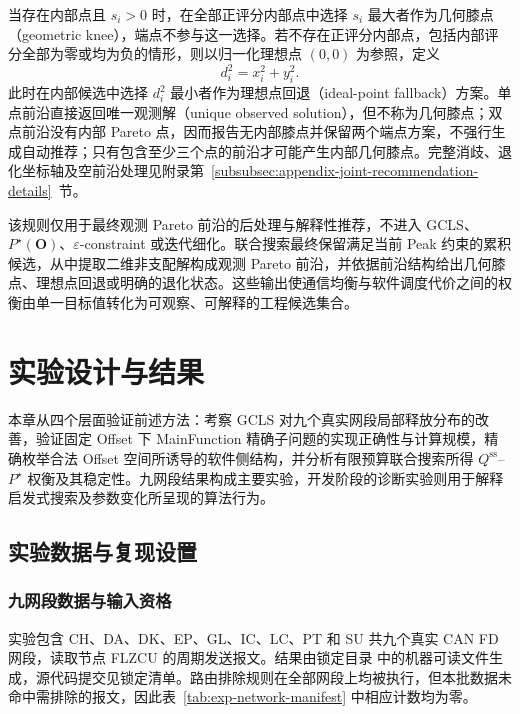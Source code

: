 \documentclass[UTF8,a4paper,twoside,zihao=-4]{ctexart}
\numberwithin{equation}{section}
\numberwithin{figure}{section}
\numberwithin{table}{section}
\theoremstyle{definition}
\numberwithin{algocf}{section}
\begin{document}
当存在内部点且 $s_i>0$ 时，在全部正评分内部点中选择 $s_i$ 最大者作为几何膝点（geometric knee），端点不参与这一选择。若不存在正评分内部点，包括内部评分全部为零或均为负的情形，则以归一化理想点 $(0,0)$ 为参照，定义
\begin{equation}
 d_i^2=x_i^2+y_i^2.
\label{eq:knee-ideal-distance}
\end{equation}
此时在内部候选中选择 $d_i^2$ 最小者作为理想点回退（ideal-point fallback）方案。单点前沿直接返回唯一观测解（unique observed solution），但不称为几何膝点；双点前沿没有内部 Pareto 点，因而报告无内部膝点并保留两个端点方案，不强行生成自动推荐；只有包含至少三个点的前沿才可能产生内部几何膝点。完整消歧、退化坐标轴及空前沿处理见附录第~\ref{subsubsec:appendix-joint-recommendation-details}~节。

该规则仅用于最终观测 Pareto 前沿的后处理与解释性推荐，不进入 GCLS、$P^\star(\boldsymbol O)$、$\varepsilon$-constraint 或迭代细化。联合搜索最终保留满足当前 Peak 约束的累积候选，从中提取二维非支配解构成观测 Pareto 前沿，并依据前沿结构给出几何膝点、理想点回退或明确的退化状态。这些输出使通信均衡与软件调度代价之间的权衡由单一目标值转化为可观察、可解释的工程候选集合\cite{debgupta2011}。

\clearpage

\section{实验设计与结果}
\label{sec:experiments}

本章从四个层面验证前述方法：考察 GCLS 对九个真实网段局部释放分布的改善，验证固定 Offset 下 MainFunction 精确子问题的实现正确性与计算规模，精确枚举合法 Offset 空间所诱导的软件侧结构，并分析有限预算联合搜索所得 $Q^{\mathrm{ss}}$--$P^\star$ 权衡及其稳定性。九网段结果构成主要实验，开发阶段的诊断实验则用于解释启发式搜索及参数变化所呈现的算法行为。



\subsection{实验数据与复现设置}
\label{subsec:exp-data-reproducibility}

\subsubsection{九网段数据与输入资格}
\label{subsubsec:exp-network-data}

实验包含 CH、DA、DK、EP、GL、IC、LC、PT 和 SU 共九个真实 CAN FD 网段，读取节点 FLZCU 的周期发送报文。结果由锁定目录
中的机器可读文件生成，源代码提交见锁定清单。路由排除规则在全部网段上均被执行，但本批数据未命中需排除的报文，因此表~\ref{tab:exp-network-manifest} 中相应计数均为零。
\end{document}
